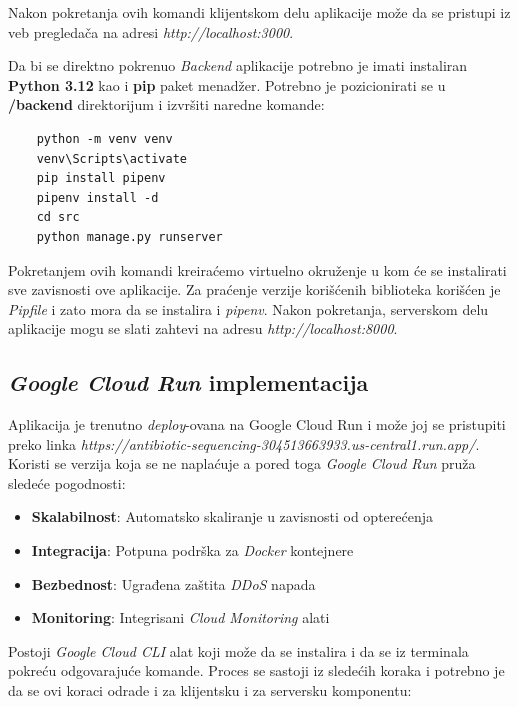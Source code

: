 \documentclass[12pt,oneside]{memoir}
\begin{document}
Nakon pokretanja ovih komandi klijentskom delu aplikacije može da se pristupi iz veb pregledača na adresi \emph{http://localhost:3000}.

Da bi se direktno pokrenuo \emph{Backend} aplikacije potrebno je imati instaliran \textbf{Python 3.12} kao i \textbf{pip} paket menadžer. Potrebno je pozicionirati se u \textbf{/backend} direktorijum i izvršiti naredne komande:  
\begin{verbatim}
    python -m venv venv
    venv\Scripts\activate
    pip install pipenv
    pipenv install -d
    cd src
    python manage.py runserver
\end{verbatim}

Pokretanjem ovih komandi kreiraćemo virtuelno okruženje u kom će se instalirati sve zavisnosti ove aplikacije. Za praćenje verzije korišćenih biblioteka korišćen je \emph{Pipfile} i zato mora da se instalira i \emph{pipenv}.
Nakon pokretanja, serverskom delu aplikacije mogu se slati zahtevi na adresu \emph{http://localhost:8000}.

\subsection{\emph{Google Cloud Run} implementacija}
Aplikacija je trenutno \emph{deploy}-ovana na Google Cloud Run i može joj se pristupiti preko linka \emph{https://antibiotic-sequencing-304513663933.us-central1.run.app/}.
Koristi se verzija koja se ne naplaćuje a pored toga \emph{Google Cloud Run} pruža sledeće pogodnosti:

\begin{itemize}
\item \textbf{Skalabilnost}: Automatsko skaliranje u zavisnosti od opterećenja
\item \textbf{Integracija}: Potpuna podrška za \emph{Docker} kontejnere
\item \textbf{Bezbednost}: Ugrađena zaštita \emph{DDoS} napada
\item \textbf{Monitoring}: Integrisani \emph{Cloud Monitoring} alati
\end{itemize}

Postoji \emph{Google Cloud CLI} alat koji može da se instalira i da se iz terminala pokreću odgovarajuće komande. Proces se sastoji iz sledećih koraka i potrebno je da se ovi koraci odrade i za klijentsku i za serversku komponentu:
\end{document}
